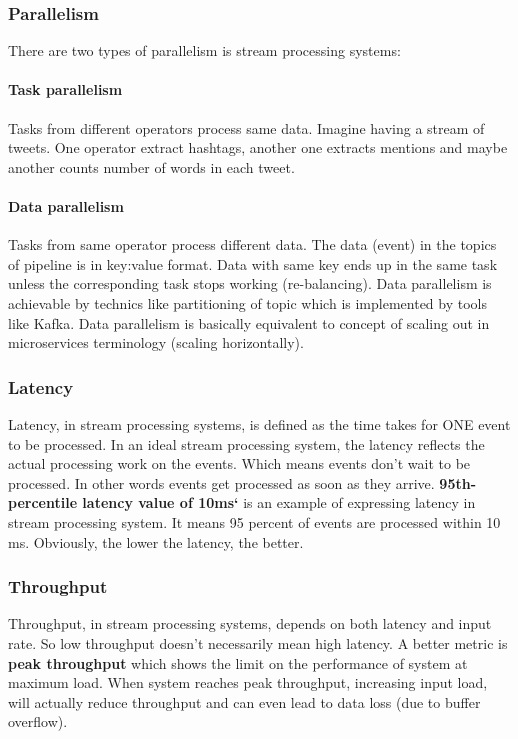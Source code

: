 \documentclass[a4]{report}
\begin{document}
    \subsubsection{Parallelism}
    There are two types of parallelism is stream processing systems:

    \paragraph{Task parallelism}
    Tasks from different operators process same data.
    Imagine having a stream of tweets.
    One operator extract hashtags, another one extracts mentions and maybe another counts number of words in each
    tweet.

    \paragraph{Data parallelism}
    Tasks from same operator process different data.
    The data (event) in the topics of pipeline is in key:value format.
    Data with same key ends up in the same task unless the corresponding task stops working (re-balancing).
    Data parallelism is achievable by technics like partitioning of topic which is implemented by tools like Kafka.
    Data parallelism is basically equivalent to concept of scaling out in microservices terminology (scaling
    horizontally).

    \subsubsection{Latency}
    Latency, in stream processing systems, is defined as the time takes for ONE event to be processed.
    In an ideal stream processing system, the latency reflects the actual processing work on the events.
    Which means events don't wait to be processed.
    In other words events get processed as soon as they arrive.
    \textbf{95th-percentile latency value of 10ms`} is an example of expressing latency in stream processing system.
    It means 95 percent of events are processed within 10 ms.
    Obviously, the lower the latency, the better.

    \subsubsection{Throughput}
    Throughput, in stream processing systems, depends on both latency and input rate.
    So low throughput doesn't necessarily mean high latency.
    A better metric is \textbf{peak throughput} which shows the limit on the performance of system at maximum load.
    When system reaches peak throughput, increasing input load, will actually reduce throughput and can even lead to
    data loss (due to buffer overflow).
\end{document}
